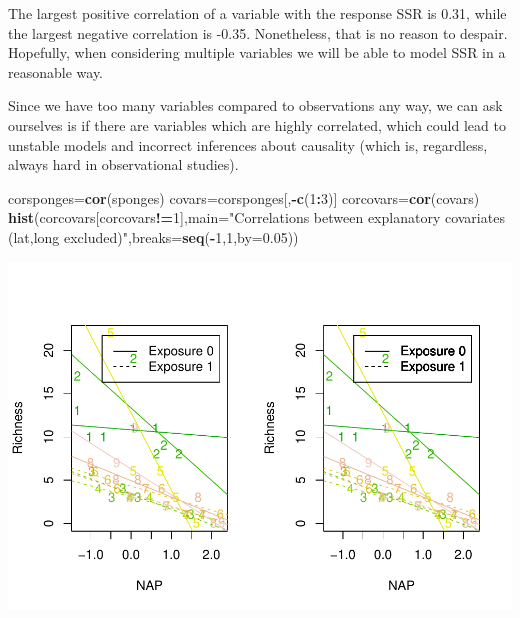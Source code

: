 \documentclass[
]{book}
\newenvironment{Shaded}{\begin{snugshade}}{\end{snugshade}}
\newcommand{\AttributeTok}[1]{\textcolor[rgb]{0.13,0.29,0.53}{#1}}
\newcommand{\DecValTok}[1]{\textcolor[rgb]{0.00,0.00,0.81}{#1}}
\newcommand{\FloatTok}[1]{\textcolor[rgb]{0.00,0.00,0.81}{#1}}
\newcommand{\FunctionTok}[1]{\textcolor[rgb]{0.13,0.29,0.53}{\textbf{#1}}}
\newcommand{\NormalTok}[1]{#1}
\newcommand{\OtherTok}[1]{\textcolor[rgb]{0.56,0.35,0.01}{#1}}
\newcommand{\SpecialCharTok}[1]{\textcolor[rgb]{0.81,0.36,0.00}{\textbf{#1}}}
\newcommand{\StringTok}[1]{\textcolor[rgb]{0.31,0.60,0.02}{#1}}
\begin{document}
The largest positive correlation of a variable with the response SSR is 0.31, while the largest negative correlation is -0.35. Nonetheless, that is no reason to despair. Hopefully, when considering multiple variables we will be able to model SSR in a reasonable way.

Since we have too many variables compared to observations any way, we can ask ourselves is if there are variables which are highly correlated, which could lead to unstable models and incorrect inferences about causality (which is, regardless, always hard in observational studies).

\begin{Shaded}
\begin{Highlighting}[]
\NormalTok{corsponges}\OtherTok{=}\FunctionTok{cor}\NormalTok{(sponges)}
\NormalTok{covars}\OtherTok{=}\NormalTok{corsponges[,}\SpecialCharTok{{-}}\FunctionTok{c}\NormalTok{(}\DecValTok{1}\SpecialCharTok{:}\DecValTok{3}\NormalTok{)]}
\NormalTok{corcovars}\OtherTok{=}\FunctionTok{cor}\NormalTok{(covars)}
\FunctionTok{hist}\NormalTok{(corcovars[corcovars}\SpecialCharTok{!=}\DecValTok{1}\NormalTok{],}\AttributeTok{main=}\StringTok{"Correlations between explanatory covariates (lat,long excluded)"}\NormalTok{,}\AttributeTok{breaks=}\FunctionTok{seq}\NormalTok{(}\SpecialCharTok{{-}}\DecValTok{1}\NormalTok{,}\DecValTok{1}\NormalTok{,}\AttributeTok{by=}\FloatTok{0.05}\NormalTok{))}
\end{Highlighting}
\end{Shaded}

\includegraphics{ECOMODbook_files/figure-latex/unnamed-chunk-68-1.pdf}
\end{document}
